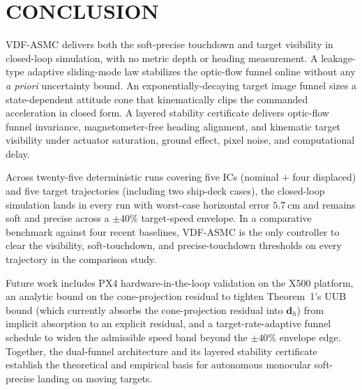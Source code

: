 \documentclass{IEEEtaes}
\begin{document}




\section{CONCLUSION}
\label{conclusion: section}
VDF-ASMC delivers both the soft-precise touchdown and target visibility in closed-loop simulation, with no metric depth or heading measurement. A leakage-type adaptive sliding-mode law stabilizes the optic-flow funnel online without any \emph{a priori} uncertainty bound. An exponentially-decaying target image funnel sizes a state-dependent attitude cone that kinematically clips the commanded acceleration in closed form. A layered stability certificate delivers optic-flow funnel invariance, magnetometer-free heading alignment, and kinematic target visibility under actuator saturation, ground effect, pixel noise, and computational delay.

Across twenty-five deterministic runs covering five ICs (nominal $+$ four displaced) and five target trajectories (including two ship-deck cases), the closed-loop simulation lands in every run with worst-case horizontal error $5.7~\text{cm}$ and remains soft and precise across a $\pm 40\%$ target-speed envelope. In a comparative benchmark against four recent baselines, VDF-ASMC is the only controller to clear the visibility, soft-touchdown, and precise-touchdown thresholds on every trajectory in the comparison study.

Future work includes PX4 hardware-in-the-loop validation on the X500 platform, an analytic bound on the cone-projection residual to tighten Theorem~1's UUB bound (which currently absorbs the cone-projection residual into $\boldsymbol{d}_h$) from implicit absorption to an explicit residual, and a target-rate-adaptive funnel schedule to widen the admissible speed band beyond the $\pm 40\%$ envelope edge. Together, the dual-funnel architecture and its layered stability certificate establish the theoretical and empirical basis for autonomous monocular soft-precise landing on moving targets.



\end{document}
